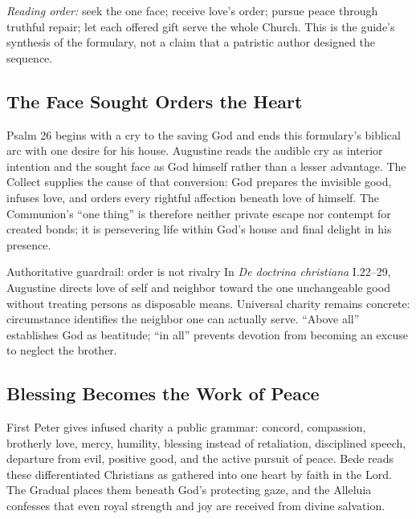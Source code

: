\begin{deepstudy}
\noindent\emph{Reading order:} seek the one face; receive love's order; pursue peace through truthful repair; let each offered gift serve the whole Church. This is the guide's synthesis of the formulary, not a claim that a patristic author designed the sequence.

\sectionguard
\subsection*{The Face Sought Orders the Heart\enspace{}}

Psalm 26 begins with a cry to the saving God and ends this formulary's biblical arc with one desire for his house. Augustine reads the audible cry as interior intention and the sought face as God himself rather than a lesser advantage. The Collect supplies the cause of that conversion: God prepares the invisible good, infuses love, and orders every rightful affection beneath love of himself. The Communion's ``one thing'' is therefore neither private escape nor contempt for created bonds; it is persevering life within God's house and final delight in his presence.

\begin{studybox}{Authoritative guardrail: order is not rivalry}
In \emph{De doctrina christiana} I.22--29, Augustine directs love of self and neighbor toward the one unchangeable good without treating persons as disposable means. Universal charity remains concrete: circumstance identifies the neighbor one can actually serve. ``Above all'' establishes God as beatitude; ``in all'' prevents devotion from becoming an excuse to neglect the brother.
\end{studybox}

\sectionguard
\subsection*{Blessing Becomes the Work of Peace\enspace{}}

First Peter gives infused charity a public grammar: concord, compassion, brotherly love, mercy, humility, blessing instead of retaliation, disciplined speech, departure from evil, positive good, and the active pursuit of peace. Bede reads these differentiated Christians as gathered into one heart by faith in the Lord. The Gradual places them beneath God's protecting gaze, and the Alleluia confesses that even royal strength and joy are received from divine salvation.


\end{deepstudy}
